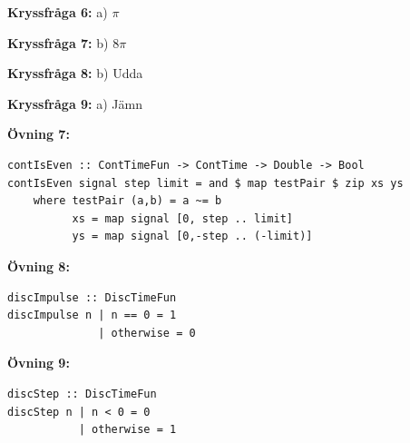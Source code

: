 \documentclass{article}
\begin{document}
\textbf{Kryssfråga 6:} a) $\pi$

\textbf{Kryssfråga 7:} b) $8\pi$

\textbf{Kryssfråga 8:} b) Udda

\textbf{Kryssfråga 9:} a) Jämn

\textbf{Övning 7:}
\begin{verbatim}
contIsEven :: ContTimeFun -> ContTime -> Double -> Bool
contIsEven signal step limit = and $ map testPair $ zip xs ys
    where testPair (a,b) = a ~= b
          xs = map signal [0, step .. limit]
          ys = map signal [0,-step .. (-limit)]
\end{verbatim}
\textbf{Övning 8:}
\begin{verbatim}
discImpulse :: DiscTimeFun
discImpulse n | n == 0 = 1
              | otherwise = 0
\end{verbatim}
\textbf{Övning 9:}
\begin{verbatim}
discStep :: DiscTimeFun
discStep n | n < 0 = 0
           | otherwise = 1
\end{verbatim}
\end{document}
